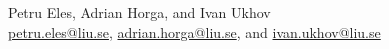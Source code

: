 Petru Eles, Adrian Horga, and Ivan Ukhov\\
\vspace{0.5em}
\href{mailto:petru.eles@liu.se}{petru.eles@liu.se},
\href{mailto:petru.eles@liu.se}{adrian.horga@liu.se}, and
\href{mailto:ivan.ukhov@liu.se}{ivan.ukhov@liu.se}
